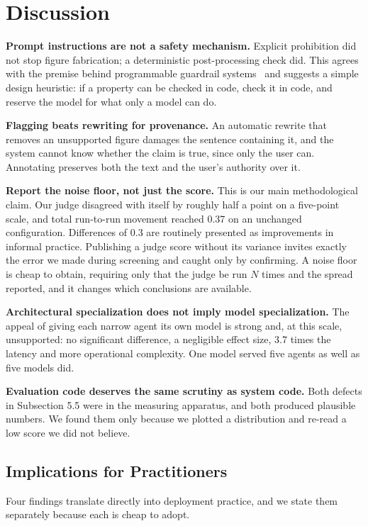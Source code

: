 \documentclass[9pt,twocolumn]{extarticle}
\begin{document}
\section{Discussion}

\textbf{Prompt instructions are not a safety mechanism.} Explicit prohibition
did not stop figure fabrication; a deterministic post-processing check did. This
agrees with the premise behind programmable guardrail
systems~\cite{rebedea2023nemo} and suggests a simple design heuristic: if a
property can be checked in code, check it in code, and reserve the model for
what only a model can do.

\textbf{Flagging beats rewriting for provenance.} An automatic rewrite that
removes an unsupported figure damages the sentence containing it, and the system
cannot know whether the claim is true, since only the user can. Annotating
preserves both the text and the user's authority over it.

\textbf{Report the noise floor, not just the score.} This is our main
methodological claim. Our judge disagreed with itself by roughly half a point
on a five-point scale, and total run-to-run movement reached 0.37 on an
unchanged configuration. Differences of 0.3 are routinely presented as
improvements in informal practice. Publishing a judge score without its
variance invites exactly the error we made during screening and caught only by
confirming. A noise floor is cheap to obtain, requiring only that the judge be
run $N$ times and the spread reported, and it changes which conclusions are
available.

\textbf{Architectural specialization does not imply model specialization.} The
appeal of giving each narrow agent its own model is strong and, at this scale,
unsupported: no significant difference, a negligible effect size, 3.7 times the
latency and more operational complexity. One model served five agents as well
as five models did.

\textbf{Evaluation code deserves the same scrutiny as system code.} Both
defects in Subsection 5.5 were in the measuring apparatus, and both produced
plausible numbers. We found them only because we plotted a distribution and
re-read a low score we did not believe.

\subsection{Implications for Practitioners}
Four findings translate directly into deployment practice, and we state them
separately because each is cheap to adopt.
\end{document}
